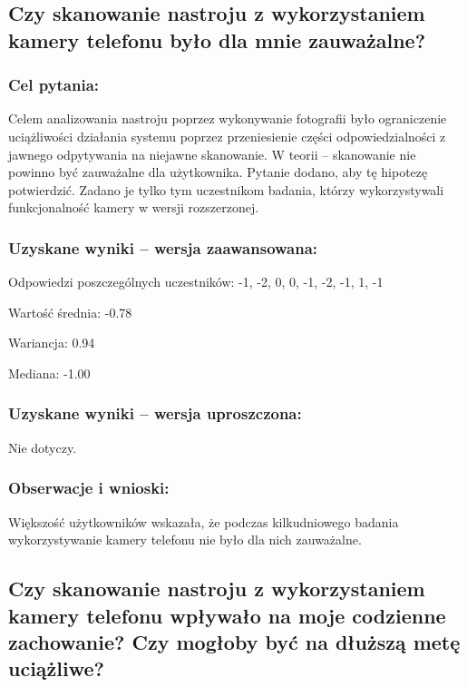 	
	
\subsection{Czy skanowanie nastroju z wykorzystaniem kamery telefonu było dla mnie zauważalne?}
	
	\subsubsection{Cel pytania:}
	
	Celem analizowania nastroju poprzez wykonywanie fotografii było ograniczenie uciążliwości działania systemu poprzez przeniesienie części odpowiedzialności z jawnego odpytywania na niejawne skanowanie. W teorii -- skanowanie nie powinno być zauważalne dla użytkownika. Pytanie dodano, aby tę hipotezę potwierdzić. Zadano je tylko tym uczestnikom badania, którzy wykorzystywali funkcjonalność kamery w wersji rozszerzonej.
	
	\subsubsection{Uzyskane wyniki -- wersja zaawansowana:}
	
	Odpowiedzi poszczególnych uczestników: -1, -2, 0, 0, -1, -2, -1, 1, -1
	
	Wartość średnia: -0.78
	
	Wariancja: 0.94
	
	Mediana: -1.00
	
	\subsubsection{Uzyskane wyniki -- wersja uproszczona:}
	
	Nie dotyczy.
	
	\subsubsection{Obserwacje i wnioski:}
	
	Większość użytkowników wskazała, że podczas kilkudniowego badania wykorzystywanie kamery telefonu nie było dla nich zauważalne. 
	
	
	
\subsection{Czy skanowanie nastroju z wykorzystaniem kamery telefonu wpływało na moje codzienne zachowanie? Czy mogłoby być na dłuższą metę uciążliwe?}
	

